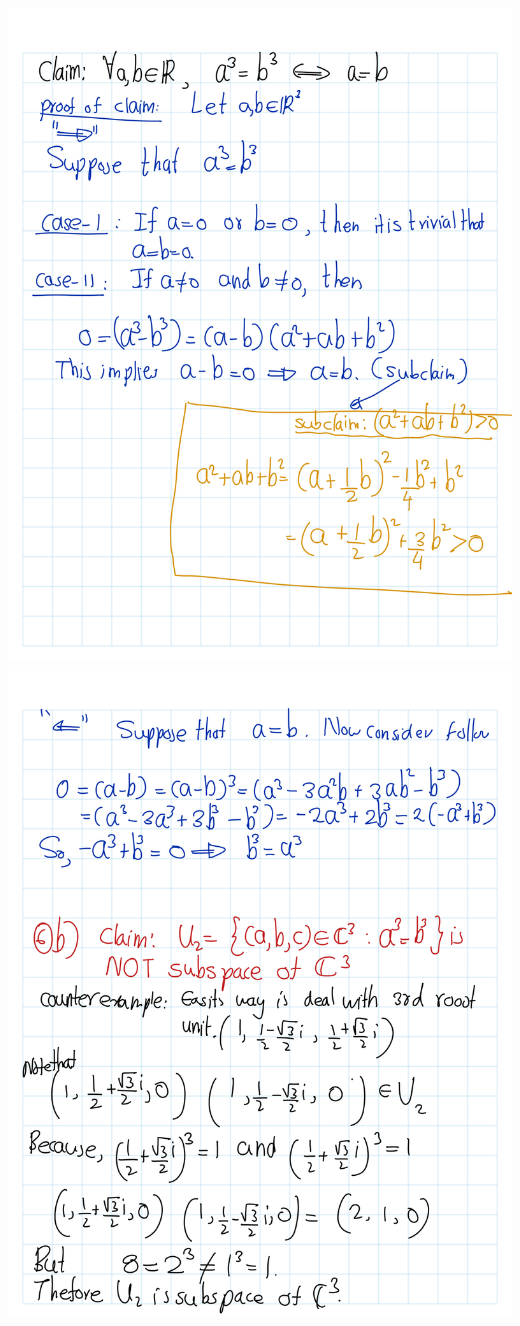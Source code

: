 \documentclass[
]{book}
\theoremstyle{definition}
\theoremstyle{definition}
\theoremstyle{definition}
\theoremstyle{definition}
\theoremstyle{remark}
\begin{document}
\begin{enumerate}
  \includegraphics{fig/Ex1C/Ex/Ex-02.png} \includegraphics{fig/Ex1C/Ex/Ex-03.png}

\end{enumerate}
\end{document}
